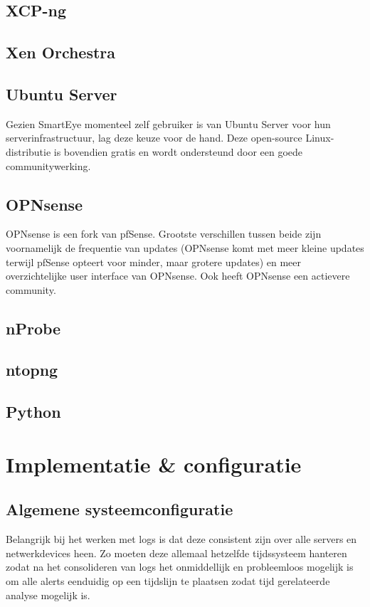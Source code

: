 \subsection{XCP-ng}

\subsection{Xen Orchestra}

\subsection{Ubuntu Server}
Gezien SmartEye momenteel zelf gebruiker is van Ubuntu Server voor hun serverinfrastructuur, lag deze keuze voor de hand. Deze open-source Linux-distributie is bovendien gratis en wordt ondersteund door een goede communitywerking.

\subsection{OPNsense}
OPNsense is een fork van pfSense. Grootste verschillen tussen beide zijn voornamelijk de frequentie van updates (OPNsense komt met meer kleine updates terwijl pfSense opteert voor minder, maar grotere updates) en meer overzichtelijke user interface van OPNsense. Ook heeft OPNsense een actievere community.

\subsection{nProbe}

\subsection{ntopng}

\subsection{Python}

\section{Implementatie \& configuratie}
\subsection{Algemene systeemconfiguratie}
Belangrijk bij het werken met logs is dat deze consistent zijn over alle servers en netwerkdevices heen. Zo moeten deze allemaal hetzelfde tijdssysteem hanteren zodat na het consolideren van logs het onmiddellijk en probleemloos mogelijk is om alle alerts eenduidig op een tijdslijn te plaatsen zodat tijd gerelateerde analyse mogelijk is.

